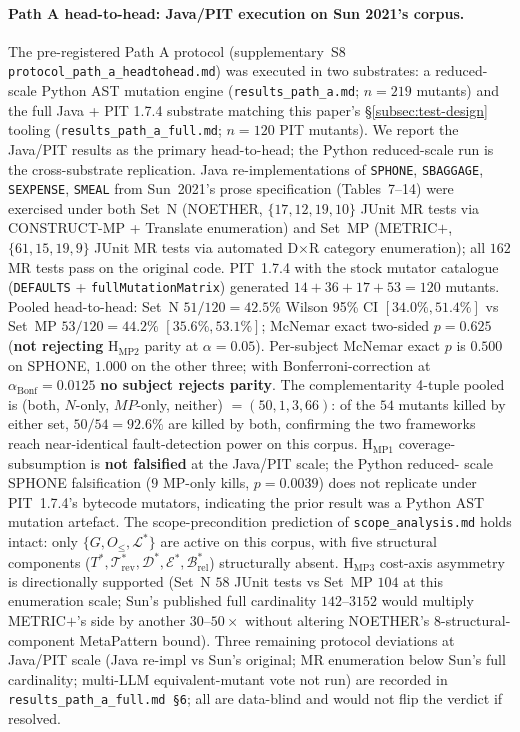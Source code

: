 \documentclass[acmsmall,screen,review]{acmart}
\begin{document}
\paragraph{Path A head-to-head: Java/PIT execution on Sun 2021's corpus.}
\label{para:path-a-results}
The pre-registered Path A protocol (supplementary~S8
\texttt{protocol\_path\_a\_headtohead.md}) was executed in two
substrates: a reduced-scale Python AST mutation engine
(\texttt{results\_path\_a.md}; $n = 219$ mutants) and the full
Java + PIT 1.7.4 substrate matching this paper's
\S\ref{subsec:test-design} tooling
(\texttt{results\_path\_a\_full.md}; $n = 120$ PIT mutants). We
report the Java/PIT results as the primary head-to-head; the Python
reduced-scale run is the cross-substrate replication. Java
re-implementations of \texttt{SPHONE}, \texttt{SBAGGAGE},
\texttt{SEXPENSE}, \texttt{SMEAL} from Sun~2021's prose
specification (Tables~7--14) were exercised under both Set~N
(NOETHER, $\{17, 12, 19, 10\}$ JUnit MR tests via CONSTRUCT-MP +
Translate enumeration) and Set~MP (METRIC$+$, $\{61, 15, 19, 9\}$
JUnit MR tests via automated D$\times$R category enumeration); all
$162$ MR tests pass on the original code. PIT~1.7.4 with the stock
mutator catalogue (\texttt{DEFAULTS} + \texttt{fullMutationMatrix})
generated $14 + 36 + 17 + 53 = 120$ mutants. Pooled head-to-head:
Set~N $51/120 = 42.5\%$ Wilson 95\% CI $[34.0\%, 51.4\%]$ vs Set~MP
$53/120 = 44.2\%$ $[35.6\%, 53.1\%]$; McNemar exact two-sided
$p = 0.625$ (\textbf{not rejecting} H$_{\mathrm{MP2}}$ parity at
$\alpha = 0.05$). Per-subject McNemar exact $p$ is $0.500$ on
SPHONE, $1.000$ on the other three; with Bonferroni-correction at
$\alpha_{\mathrm{Bonf}} = 0.0125$ \textbf{no subject rejects parity}.
The complementarity 4-tuple pooled is
(both, $N$-only, $MP$-only, neither) $= (50, 1, 3, 66)$: of the $54$
mutants killed by either set, $50/54 = 92.6\%$ are killed by both,
confirming the two frameworks reach near-identical fault-detection
power on this corpus. H$_{\mathrm{MP1}}$ coverage-subsumption is
\textbf{not falsified} at the Java/PIT scale; the Python reduced-
scale SPHONE falsification ($9$ MP-only kills, $p = 0.0039$) does
not replicate under PIT~1.7.4's bytecode mutators, indicating the
prior result was a Python AST mutation artefact. The
scope-precondition prediction of \texttt{scope\_analysis.md}
holds intact: only $\{G, O_{\le}, \mathcal{L}^{*}\}$ are active on
this corpus, with five structural components ($T^{*}, \mathcal{T}^{*}_{\mathrm{rev}},
\mathcal{D}^{*}, \mathcal{E}^{*}, \mathcal{B}^{*}_{\mathrm{rel}}$)
structurally absent. H$_{\mathrm{MP3}}$ cost-axis asymmetry is
directionally supported (Set~N $58$ JUnit tests vs Set~MP $104$ at
this enumeration scale; Sun's published full cardinality
$142$--$3152$ would multiply METRIC$+$'s side by another $30$--$50\times$
without altering NOETHER's $8$-structural-component MetaPattern bound). Three
remaining protocol deviations at Java/PIT scale (Java re-impl vs
Sun's original; MR enumeration below Sun's full cardinality;
multi-LLM equivalent-mutant vote not run) are recorded in
\texttt{results\_path\_a\_full.md~\S 6}; all are data-blind and
would not flip the verdict if resolved.
\end{document}
